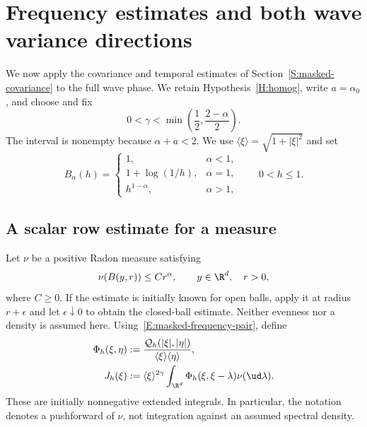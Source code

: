 \section{Frequency estimates and both wave variance directions}
\label{S:wave-variance}

We now apply the covariance and temporal estimates of
Section~\ref{S:masked-covariance} to the full wave phase. We retain
Hypothesis~\ref{H:homog}, write $a = \alpha_0$, and choose and fix
\begin{equation}\label{E:variance-gamma-range}
  0 < \gamma < \min\left(\frac12,\frac{2-\alpha}{2}\right).
\end{equation}
The interval is nonempty because $\alpha+a < 2$. We use
$\langle\xi\rangle = \sqrt{1+|\xi|^2}$ and set
\begin{equation}\label{E:variance-scale-profile}
  B_\alpha(h) =
  \begin{cases}
    1, & \alpha < 1,\\
    1+\log(1/h), & \alpha = 1,\\
    h^{1-\alpha}, & \alpha > 1,
  \end{cases}
  \qquad 0 < h \le 1.
\end{equation}

\subsection{A scalar row estimate for a measure}

Let $\nu$ be a positive Radon measure satisfying
\begin{equation}\label{E:frequency-translated-growth}
  \nu(B(y,r)) \le C r^\alpha,
  \qquad y \in \R^d,\quad r > 0,
\end{equation}
where $C \ge 0$. If the estimate is initially known for open balls, apply
it at radius $r+\epsilon$ and let $\epsilon \downarrow 0$ to obtain the
closed-ball estimate. Neither evenness nor a density is assumed here.
Using~\eqref{E:masked-frequency-pair}, define
\begin{align}
  \Phi_h(\xi,\eta)
  &:= \frac{\mathcal Q_h(|\xi|,|\eta|)}
  {\langle\xi\rangle\langle\eta\rangle},
  \label{E:frequency-row-kernel}\\
  J_h(\xi)
  &:= \langle\xi\rangle^{2\gamma}
  \int_{\R^d}\Phi_h(\xi,\xi-\lambda)\nu(\ud\lambda).
  \label{E:frequency-row-integral}
\end{align}
These are initially nonnegative extended integrals. In particular, the
notation denotes a pushforward of $\nu$, not integration against an
assumed spectral density.

